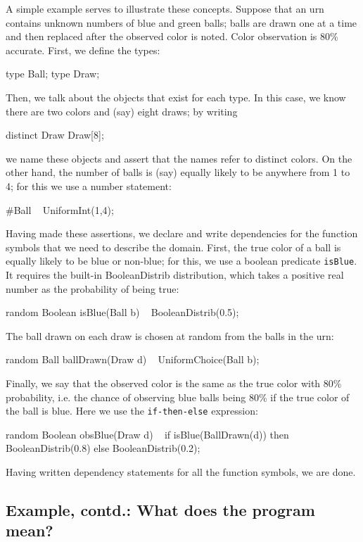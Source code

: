 \documentclass[12pt]{article}
\begin{document}
A simple example serves to illustrate these concepts. Suppose that an urn contains unknown numbers of blue and green balls;
balls are drawn one at a time and then replaced after the observed color is noted. Color observation is 80\% accurate.
First, we define the types:
\begin{blogcode}
type Ball; type Draw; 
\end{blogcode}
Then, we talk about the objects that exist for each type.
In this case, we know there are two colors and (say) eight draws; by writing
\begin{blogcode}
distinct Draw Draw[8];
\end{blogcode}
we name these objects and assert that the names refer to distinct colors.
On the other hand, the number of balls is (say) equally likely to be anywhere from 1 to 4; for this we use a number statement:
\begin{blogcode}
#Ball ~ UniformInt(1,4);
\end{blogcode}
Having made these assertions, we declare and write dependencies for the function symbols
that we need to describe the domain. First, the true color of a ball is 
equally likely to be blue or non-blue; for this, we use a boolean predicate 
\verb|isBlue|. It requires the built-in
{BooleanDistrib distribution}, which takes a positive real number as 
the probability of being true:
\begin{blogcode}
random Boolean isBlue(Ball b) ~ BooleanDistrib(0.5);
\end{blogcode}
The ball drawn on each draw is chosen at random from the balls in the urn:
\begin{blogcode}
random Ball ballDrawn(Draw d) ~ UniformChoice({Ball b});
\end{blogcode}
Finally, we say that the observed color is the same as the true color
with 80\% probability, i.e. the chance of observing blue balls being 
80\% if the true color of the ball is blue.
Here we use the \verb|if-then-else| expression:
\begin{blogcode}
random Boolean obsBlue(Draw d) ~
  if isBlue(BallDrawn(d)) then 
    BooleanDistrib(0.8)
  else
    BooleanDistrib(0.2);
\end{blogcode}
Having written dependency statements for all the function symbols, we are done.

\subsection{Example, contd.: What does the program mean?}
\end{document}
